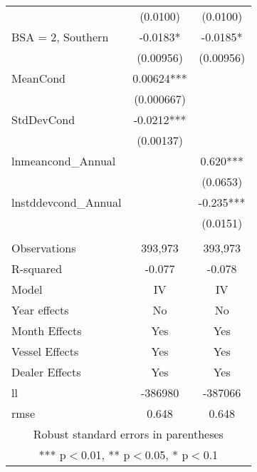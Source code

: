 \begin{tabular}{lcc}
 & (0.0100) & (0.0100) \\
BSA = 2, Southern & -0.0183* & -0.0185* \\
 & (0.00956) & (0.00956) \\
MeanCond & 0.00624*** &  \\
 & (0.000667) &  \\
StdDevCond & -0.0212*** &  \\
 & (0.00137) &  \\
lnmeancond\_Annual &  & 0.620*** \\
 &  & (0.0653) \\
lnstddevcond\_Annual &  & -0.235*** \\
 &  & (0.0151) \\
 &  &  \\
Observations & 393,973 & 393,973 \\
R-squared & -0.077 & -0.078 \\
Model & IV & IV \\
Year effects & No & No \\
Month Effects & Yes & Yes \\
Vessel Effects & Yes & Yes \\
Dealer Effects & Yes & Yes \\
ll & -386980 & -387066 \\
 rmse & 0.648 & 0.648 \\ \hline
\multicolumn{3}{c}{ Robust standard errors in parentheses} \\
\multicolumn{3}{c}{ *** p$<$0.01, ** p$<$0.05, * p$<$0.1} \\
\end{tabular}
